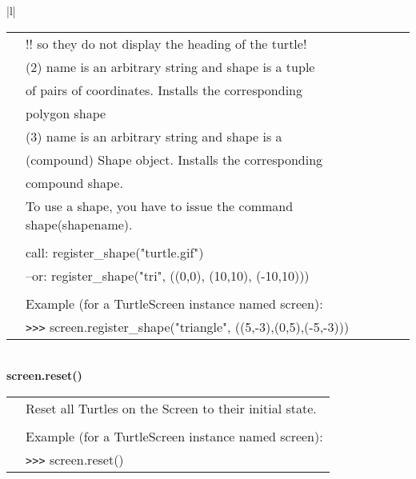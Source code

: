 \begin{center}
{\begin{tabular}{|l|}
\begin{tabular}{p{0.25in}p{4in}}
&            !! so they do not display the heading of the turtle! \\
&        (2) name is an arbitrary string and shape is a tuple \\
&            of pairs of coordinates. Installs the corresponding \\
&            polygon shape \\
&        (3) name is an arbitrary string and shape is a \\
&            (compound) Shape object. Installs the corresponding \\
&            compound shape. \\
&        To use a shape, you have to issue the command shape(shapename). \\
&  \\
&        call: register\_shape("turtle.gif") \\
&        --or: register\_shape("tri", ((0,0), (10,10), (-10,10))) \\
&  \\
&        Example (for a TurtleScreen instance named screen): \\
&        \verb+>+\verb+>+\verb+>+ screen.register\_shape("triangle", ((5,-3),(0,5),(-5,-3))) \\
\end{tabular} \\ \hline
{\bf    screen.reset()} \\
   \begin{tabular}{p{0.25in}p{4in}}
&        Reset all Turtles on the Screen to their initial state. \\
&  \\
&        Example (for a TurtleScreen instance named screen): \\
&        \verb+>+\verb+>+\verb+>+ screen.reset() \\
\end{tabular} \\ \hline



\end{tabular}}
\end{center}
